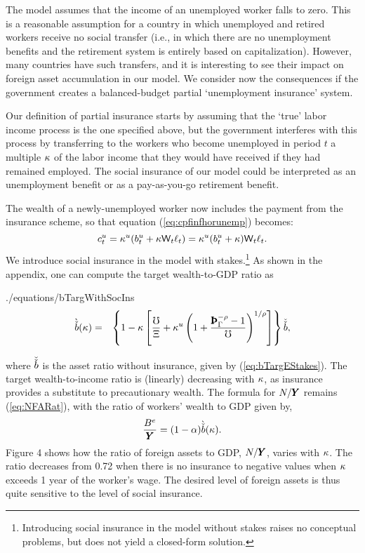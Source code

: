 \documentclass[titlepage,abstract,letterpaper]{econtex}
\renewcommand{\GDPLev}{\ensuremath{\pmb{Y}}}
\begin{document}
The model assumes that the income of an unemployed worker falls to
zero. This is a reasonable assumption for a country in which
unemployed and retired workers receive no social transfer (i.e., in
which there are no unemployment benefits and the retirement system is
entirely based on capitalization). However, many countries have such
transfers, and it is interesting to see their impact on foreign asset
accumulation in our model. We consider now the consequences if the
government creates a balanced-budget partial `unemployment insurance'
system.

Our definition of partial insurance starts by assuming that the `true'
labor income process is the one specified above, but the government
interferes with this process by transferring to the workers who become unemployed in period $t$ a multiple $\kappa$ of the labor income that they would have received if they had remained employed. The social insurance of our model could be interpreted as an unemployment benefit or as a pay-as-you-go retirement benefit.

The wealth of a newly-unemployed worker now includes the payment from the insurance scheme, so that equation (\ref{eq:cpfinfhorunemp}) becomes:
\begin{equation*}
c^{u}_{t}=\kappa^{u} (b^{u}_t+\kappa \mathsf{W}_t \ell_t)=\kappa^{u} (b^{u}_t+\kappa)\mathsf{W}_t \ell_t.
\end{equation*}
We introduce social insurance in the model with stakes.\footnote{Introducing social insurance in the model without stakes raises no conceptual problems, but does not yield a closed-form solution.} As shown in the appendix, one can compute the target wealth-to-GDP ratio as
\begin{verbatimwrite}{./equations/bTargWithSocIns}
\begin{eqnarray}
\Alt{\bTarg}(\Severance) & = &
\left\{1-\Severance \left[\frac{\urate}{\EmpGro}+\MPCU \left(1+\frac{\PatPGro^{-\CRRA}-1}{\urate}\right)^{1/\CRRA}\right]\right\}\bTargTarg,
\label{eq:bTargWithSocIns}
\end{eqnarray}
\end{verbatimwrite}

where $\check{\check{b}}$ is the asset ratio without insurance, given by (\ref{eq:bTargEStakes}). The target wealth-to-income ratio is (linearly) decreasing with $\kappa$, as insurance provides a substitute to precautionary wealth. The formula for $\NFALev/\GDPLev$ remains (\ref{eq:NFARat}), with the ratio of workers' wealth to GDP given by,
\begin{equation}
\frac{\BLevE}{\GDPLev}=(1-\kapShare) \Alt{\bTarg}(\Severance).
\label{eq:STargWithSocIns}
\end{equation}
Figure 4 shows how the ratio of foreign assets to GDP, $\NFALev/\GDPLev$, varies with $\kappa$. The ratio decreases from 0.72 when there is no insurance to negative values when $\kappa$ exceeds 1 year of the worker's wage. The desired level of foreign assets is thus quite sensitive to the level of social insurance.
\end{document}
